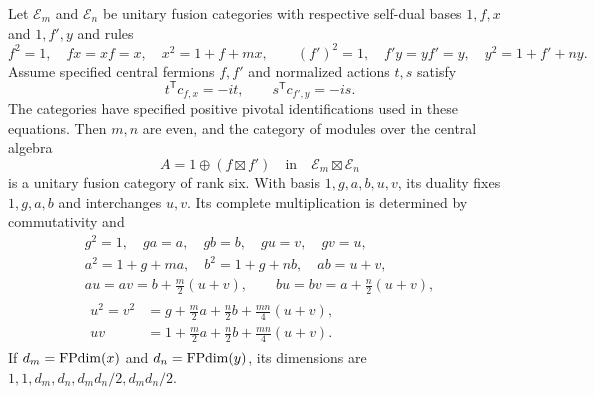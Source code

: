 \begin{theorem}\label{thm:fermionic-product}
Let $\mathcal E_m$ and $\mathcal E_n$ be unitary fusion categories with
respective self-dual bases $1,f,x$ and $1,f',y$ and rules
\[
 f^2=1,\quad fx=xf=x,\quad x^2=1+f+mx,
\qquad
 (f')^2=1,\quad f'y=yf'=y,\quad y^2=1+f'+ny.
\]
Assume specified central fermions $f,f'$ and normalized actions $t,s$
satisfy
\begin{equation}\label{eq:two-fermion-phases}
 t^{\mathsf T}c_{f,x}=-it,\qquad
 s^{\mathsf T}c_{f',y}=-is.
\end{equation}
The categories have specified positive pivotal identifications used in
these equations. Then $m,n$ are even, and the category of modules over
the central algebra
\[
 A=1\oplus(f\boxtimes f')\quad\text{in}\quad
 \mathcal E_m\boxtimes\mathcal E_n
\]
is a unitary fusion category of rank six. With basis $1,g,a,b,u,v$,
its duality fixes $1,g,a,b$ and interchanges $u,v$. Its complete
multiplication is determined by commutativity and
\begin{gather}
 g^2=1,\quad ga=a,\quad gb=b,\quad gu=v,\quad gv=u,
 \label{eq:ferm-product-1}\\
 a^2=1+g+ma,\quad b^2=1+g+nb,\quad ab=u+v,
 \label{eq:ferm-product-2}\\
 au=av=b+\tfrac m2(u+v),\qquad bu=bv=a+\tfrac n2(u+v),
 \label{eq:ferm-product-3}\\
 \begin{aligned}
 u^2=v^2&=g+\tfrac m2a+\tfrac n2b+\tfrac{mn}{4}(u+v),\\
 uv&=1+\tfrac m2a+\tfrac n2b+\tfrac{mn}{4}(u+v).
 \end{aligned}\label{eq:ferm-product-4}
\end{gather}
If $d_m=\operatorname{FPdim}(x)$ and $d_n=\operatorname{FPdim}(y)$, its dimensions are
$1,1,d_m,d_n,d_md_n/2,d_md_n/2$.
\end{theorem}
